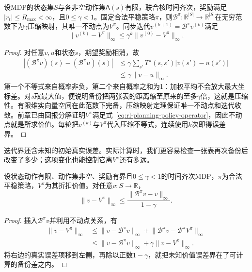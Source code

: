 \begin{theorem}[策略评价的压缩性与收敛]
 \label{thm:rl-planning-policy-contraction}
 设MDP的状态集$S$与各非空动作集$\mathsf A(s)$有限，联合核时间齐次，奖励满足$|r_t|\leq R_{\max}<\infty$，且$0\leq\gamma<1$。固定合法平稳策略$\pi$，则$\mathcal B^\pi:\mathbb R^{|S|}\to\mathbb R^{|S|}$在无穷范数下为$\gamma$压缩映射，其唯一不动点为$V^\pi$。同步迭代$v^{(k+1)}=\mathcal B^\pi v^{(k)}$满足
 \[
 \lVert v^{(k)}-V^\pi\rVert_\infty
 \leq\gamma^k\lVert v^{(0)}-V^\pi\rVert_\infty.
 \]
\end{theorem}
\begin{proof}
 对任意$v,u$和状态$s$，期望奖励相消，故
 \[
 \begin{aligned}
 |(\mathcal B^\pi v)(s)-(\mathcal B^\pi u)(s)|
 &\leq\gamma\sum_{s'}T^\pi(s,s')|v(s')-u(s')|\\
 &\leq\gamma\lVert v-u\rVert_\infty.
 \end{aligned}
 \]
 第一个不等式来自概率非负，第二个来自概率之和为1：加权平均不会放大最大坐标差。对$s$取最大值，便说明备份把两张表的距离缩至原来的至多$\gamma$倍，这就是压缩性。有限维实向量空间在此范数下完备，压缩映射定理保证唯一不动点和迭代收敛。前章已由回报分解证明$V^\pi$满足式~\eqref{eq:rl-planning-policy-operator}，因此不动点就是所求价值。每轮把$v^{(k)}$与$V^\pi$代入压缩不等式，连续使用$k$次即得误差界。
\end{proof}

迭代界还含未知的初始真实误差。实际计算时，我们更容易检查一张表再次备份后改变了多少；这项变化也能控制它离$V^\pi$还有多远。

\begin{theorem}[评价残差证书]
 \label{thm:rl-planning-evaluation-residual}
 设状态动作有限、动作集非空、奖励有界且$0\leq\gamma<1$的时间齐次MDP，$\pi$为合法平稳策略，$V^\pi$为其折扣价值。对任意$v:S\to\mathbb R$，
 \begin{equation}
 \lVert v-V^\pi\rVert_\infty
 \leq\frac{\lVert \mathcal B^\pi v-v\rVert_\infty}{1-\gamma}.
 \label{eq:rl-planning-evaluation-residual}
 \end{equation}
\end{theorem}
\begin{proof}
 插入$\mathcal B^\pi v$并利用不动点关系，有
 \[
 \begin{aligned}
 \lVert v-V^\pi\rVert_\infty
 &\leq\lVert v-\mathcal B^\pi v\rVert_\infty+
       \lVert \mathcal B^\pi v-\mathcal B^\pi V^\pi\rVert_\infty\\
 &\leq\lVert v-\mathcal B^\pi v\rVert_\infty+
       \gamma\lVert v-V^\pi\rVert_\infty.
 \end{aligned}
 \]
 将右边的真实误差项移到左侧，再除以正数$1-\gamma$，就把未知价值误差界在了可计算的备份差之内。
\end{proof}

